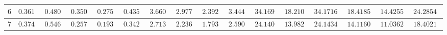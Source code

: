 \begin{landscape}
\begin{tabular}{|c|c|c|c|c|c|c|c|c|c|c|c|c|c|c|c}
$6$          & $0.3610$                                                        & $0.4804$                                                        & $0.3504$                                                          & $0.2759$                                                           & $0.4350$                                                              & $3.6600$                                                        & $2.9773$                                                          & $2.3920$                                                           & $3.4447$                                                              & $34.1694$                                                       & $18.2101$                                                         & $34.17169$                                                       & $18.41857$                                                         & $14.42551$                                                          & \multicolumn{1}{c|}{$24.28543$}                                                             \\ \hline
$7$          & $0.3748$                                                        & $0.5460$                                                        & $0.2570$                                                          & $0.1938$                                                           & $0.3421$                                                              & $2.7139$                                                        & $2.2360$                                                          & $1.7932$                                                           & $2.5908$                                                              & $24.1403$                                                       & $13.9825$                                                         & $24.14343$                                                       & $14.11601$                                                         & $11.03627$                                                          & \multicolumn{1}{c|}{$18.40213$}                                                             \\ \hline

\end{tabular}
\end{landscape}
